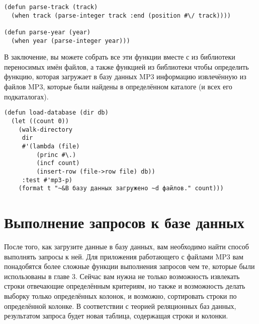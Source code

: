 \begin{lstlisting}
(defun parse-track (track)
  (when track (parse-integer track :end (position #\/ track))))

(defun parse-year (year)
  (when year (parse-integer year)))
\end{lstlisting}

В заключение, вы можете собрать все эти функции вместе с  из
библиотеки переносимых имён файлов, а также функцией  из библиотеки
 чтобы определить функцию, которая загружает в базу данных MP3 информацию
извлечённую из файлов MP3, которые были найдены в определённом каталоге (и всех его
подкаталогах).

\begin{lstlisting}
(defun load-database (dir db)
  (let ((count 0))
    (walk-directory 
     dir 
     #'(lambda (file)
         (princ #\.)
         (incf count)
         (insert-row (file->row file) db))
     :test #'mp3-p)
    (format t "~&В базу данных загружено ~d файлов." count)))
\end{lstlisting}

\section{Выполнение запросов к базе данных}

После того, как загрузите данные в базу данных, вам необходимо найти способ выполнять
запросы к ней.  Для приложения работающего с файлами MP3 вам понадобятся более сложные
функции выполнения запросов чем те, которые были использованы в главе 3.  Сейчас вам нужна
не только возможность извлекать строки отвечающие определённым критериям, но также и
возможность делать выборку только определённых колонок, и возможно, сортировать строки по
определённой колонке.  В соответствии с теорией реляционных баз данных, результатом
запроса будет новая таблица, содержащая строки и колонки.

